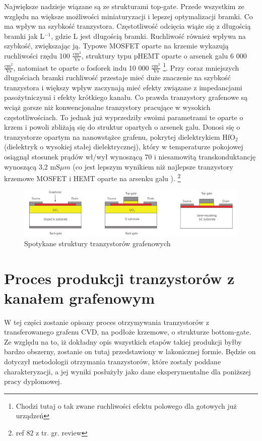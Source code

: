 Największe nadzieje wiązane są ze strukturami top-gate. Przede wszystkim ze względu na większe możliwości miniaturyzacji i 
lepszej optymalizacji bramki. Co ma wpływ na szybkość tranzystora. Częstotliwość odcięcia wiąże się z długością bramki jak
L$^{-1}$, gdzie L jest długością bramki. Ruchliwość również wpływa na szybkość, zwiększając ją. Typowe MOSFET oparte na 
krzemie wykazują ruchliwości rzędu 100 $\mathrm{\frac{cm^{2}}{Vs}}$, struktury typu pHEMT oparte o arsenek galu 6 000
$\mathrm{\frac{cm^{2}}{Vs}}$, natomiast te oparte o fosforek indu 10 000 $\mathrm{\frac{cm^{2}}{Vs}}$
\footnote{Chodzi tutaj o tak zwane ruchliwości efektu polowego dla gotowych już urządzeń}.
Przy coraz mniejszych długościach bramki ruchliwość przestaje mieć duże znaczenie na szybkość tranzystora i większy wpływ
zaczynają mieć efekty związane z impedancjami pasożytniczymi i efekty krótkiego kanału. 
Co prawda tranzystory grafenowe są wciąż gorsze niż konwencjonalne tranzystory pracujące w wysokich częstotliwościach. To
jednak już wyprzedziły swoimi parametrami te oparte o krzem i powoli zbliżają się do struktur opartych o arsenek galu.
Donosi się o tranzystorze opartym na nanowstążce grafenu, pokrytej dielektrykiem HfO$_2$ (dielektryk o wysokiej stałej 
dielektrycznej), który w temperaturze pokojowej osiągnął stosunek prądów wł/wył wynoszącą 70 i niesamowitą transkonduktancję
wynoszącą 3,2 $\mathrm{mS}{\mu m}$ (co jest lepszym wynikiem niż najlepsze tranzystory krzemowe MOSFET i HEMT oparte na 
arsenku galu ). \footnote{ref 82 z tr. gr. review}
	

	\begin{figure}[ht]
	\centering
	\includegraphics[width=1.00\textwidth]{./Rozdzial_3/obrazki/TypuBudowa}
	\caption{Spotykane struktury tranzystorów grafenowych}
	\label{fig:MOSFET_struktury}
	\end{figure}

	\section{Proces produkcji tranzystorów z kanałem grafenowym}

W tej części zostanie opisany proces otrzymywania tranzystorów z transferowanego grafenu CVD, na podłoże krzemowe, o
 strukturze bottom-gate. Ze względu na to, iż dokładny opis wszystkich etapów takiej produkcji byłby bardzo obszerny, 
zostanie on tutaj przedstawiony w lakonicznej formie. Będzie on dotyczył metodologii otrzymania tranzystorów, które
zostały poddane charakteryzacji, a jej wyniki posłużyły jako dane eksperymentalne dla poniższej pracy dyplomowej.

